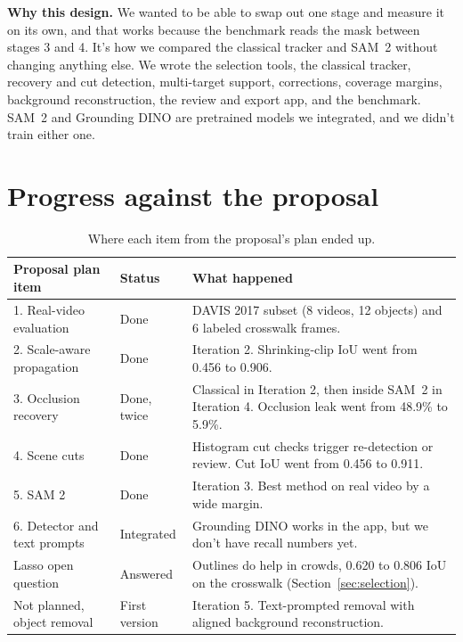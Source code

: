 \documentclass[10pt,letterpaper]{article}
\begin{document}
\textbf{Why this design.} We wanted to be able to swap out one stage and measure it on its own,
and that works because the benchmark reads the mask between stages 3 and 4. It's how we compared
the classical tracker and SAM~2 without changing anything else. We wrote the selection tools, the
classical tracker, recovery and cut detection, multi-target support, corrections, coverage
margins, background reconstruction, the review and export app, and the benchmark. SAM~2 and
Grounding DINO are pretrained models we integrated, and we didn't train either one.



\section{Progress against the proposal}

\begin{table}[h]
\centering\small
\begin{tabularx}{\linewidth}{@{}p{.27\linewidth}p{.15\linewidth}X@{}}
\toprule
Proposal plan item & Status & What happened \\
\midrule
1. Real-video evaluation & Done & DAVIS 2017 subset (8 videos, 12 objects) and 6 labeled crosswalk frames. \\
2. Scale-aware propagation & Done & Iteration 2. Shrinking-clip IoU went from 0.456 to 0.906. \\
3. Occlusion recovery & Done, twice & Classical in Iteration 2, then inside SAM~2 in Iteration 4. Occlusion leak went from 48.9\% to 5.9\%. \\
4. Scene cuts & Done & Histogram cut checks trigger re-detection or review. Cut IoU went from 0.456 to 0.911. \\
5. SAM 2 & Done & Iteration 3. Best method on real video by a wide margin. \\
6. Detector and text prompts & Integrated & Grounding DINO works in the app, but we don't have recall numbers yet. \\
Lasso open question & Answered & Outlines do help in crowds, 0.620 to 0.806 IoU on the crosswalk (Section~\ref{sec:selection}). \\
Not planned, object removal & First version & Iteration 5. Text-prompted removal with aligned background reconstruction. \\
\bottomrule
\end{tabularx}
\caption{Where each item from the proposal's plan ended up.}
\label{tab:progress}
\end{table}
\end{document}
